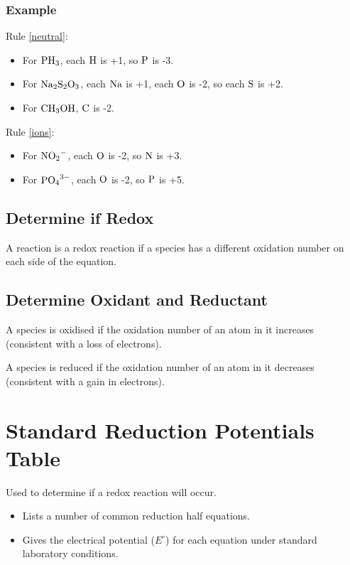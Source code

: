 \documentclass[a4paper,11pt]{article}
\begin{document}
\subsubsection{Example}

Rule \ref{neutral}:

\begin{itemize}
\item For $\ce{PH3}$, each $\ce{H}$ is +1, so $\ce{P}$ is -3.
\item For $\ce{Na2S2O3}$, each $\ce{Na}$ is +1, each $\ce{O}$ is -2, so each
	$\ce{S}$ is +2.
\item For $\ce{CH3OH}$, $\ce{C}$ is -2.
\end{itemize}

Rule \ref{ions}:

\begin{itemize}
\item For $\ce{NO2^{-}}$, each $\ce{O}$ is -2, so $\ce{N}$ is +3.
\item For $\ce{PO4^{3-}}$, each $\ce{O}$ is -2, so $\ce{P}$ is +5.
\end{itemize}

\subsection{Determine if Redox}

A reaction is a redox reaction if a species has a different oxidation number on
each side of the equation.

\subsection{Determine Oxidant and Reductant}

A species is oxidised if the oxidation number of an atom in it increases
(consistent with a loss of electrons).

A species is reduced if the oxidation number of an atom in it decreases
(consistent with a gain in electrons).



\section{Standard Reduction Potentials Table}

Used to determine if a redox reaction will occur.

\begin{itemize}
\item Lists a number of common reduction half equations.
\item Gives the electrical potential ($E^\circ$) for each equation under
	standard laboratory conditions.
\end{itemize}
\end{document}

